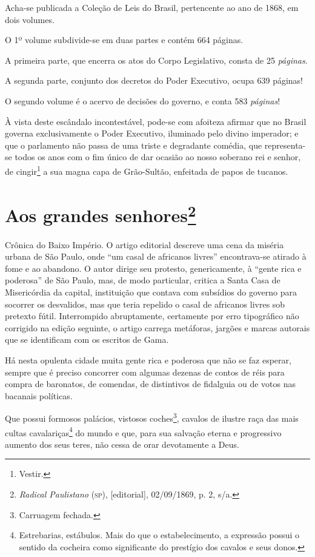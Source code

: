 Acha-se publicada a Coleção de Leis do Brasil, pertencente ao ano de
1868, em dois volumes.

O 1º volume subdivide-se em duas partes e contém 664 páginas.

A primeira parte, que encerra os atos do Corpo Legislativo, consta de 25
\emph{páginas}.

A segunda parte, conjunto dos decretos do Poder Executivo, ocupa 639
páginas!

O segundo volume é o acervo de decisões do governo, e conta 583
\emph{páginas}!

À vista deste escândalo incontestável, pode-se com afoiteza afirmar que
no Brasil governa exclusivamente o Poder Executivo, iluminado pelo
divino imperador; e que o parlamento não passa de uma triste e
degradante comédia, que representa-se todos os anos com o fim único de
dar ocasião ao nosso soberano rei e senhor, de cingir\footnote{Vestir.}
a sua magna capa de Grão-Sultão, enfeitada de papos de tucanos.

\chapter{Aos grandes senhores\footnote{\emph{Radical Paulistano} (\textsc{sp}),
  {[}editorial{]}, 02/09/1869, p. 2, s/a.}}

\begin{didascalia}
Crônica do Baixo Império. O artigo editorial descreve uma cena da
miséria urbana de São Paulo, onde ``um casal de africanos livres''
encontrava-se atirado à fome e ao abandono. O autor dirige seu protesto,
genericamente, à ``gente rica e poderosa'' de São Paulo, mas, de modo
particular, critica a Santa Casa de Misericórdia da capital, instituição
que contava com subsídios do governo para socorrer os desvalidos, mas
que teria repelido o casal de africanos livres sob pretexto fútil.
Interrompido abruptamente, certamente por erro tipográfico não corrigido
na edição seguinte, o artigo carrega metáforas, jargões e marcas
autorais que se identificam com os escritos de Gama.
\end{didascalia}



Há nesta opulenta cidade muita gente rica e poderosa que não se faz
esperar, sempre que é preciso concorrer com algumas dezenas de contos de
réis para compra de baronatos, de comendas, de distintivos de fidalguia
ou de votos nas bacanais políticas.

Que possui formosos palácios, vistosos coches\footnote{Carruagem
  fechada.}, cavalos de ilustre raça das mais cultas
cavalariças\footnote{Estrebarias, estábulos. Mais do que o
  estabelecimento, a expressão possui o sentido da cocheira como
  significante do prestígio dos cavalos e seus donos.} do mundo e que,
para sua salvação eterna e progressivo aumento dos seus teres, não cessa
de orar devotamente a Deus.


